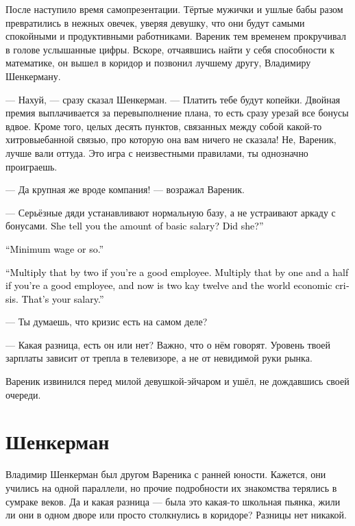 \documentclass[a4paper,10pt,fleqn]{book}\usepackage{polyglossia}\setdefaultlanguage{english}\setotherlanguage{russian}\defaultfontfeatures{Ligatures=TeX,Mapping=tex-text} \usepackage{xcolor}\definecolor{lightgray}{HTML}{bbbbbb}\color{lightgray}\newcommand{\ml}[3]{\textcolor{black}{#3}}
\begin{document}
После наступило время самопрезентации.
Тёртые мужички и ушлые бабы разом превратились в нежных овечек, уверяя девушку, что они будут самыми спокойными и продуктивными работниками.
Вареник тем временем прокручивал в голове услышанные цифры.
Вскоре, отчаявшись найти у себя способности к математике, он вышел в коридор и позвонил лучшему другу, Владимиру Шенкерману.

--- Нахуй, --- сразу сказал Шенкерман.
--- Платить тебе будут копейки.
Двойная премия выплачивается за перевыполнение плана, то есть сразу урезай все бонусы вдвое.
Кроме того, целых десять пунктов, связанных между собой какой-то хитровыебанной связью, про которую она вам ничего не сказала!
Не, Вареник, лучше вали оттуда.
Это игра с неизвестными правилами, ты однозначно проиграешь.

--- Да крупная же вроде компания! --- возражал Вареник.

--- Серьёзные дяди устанавливают нормальную базу, а не устраивают аркаду с бонусами.
\ml{$0$}
{Она сказала тебе размер базового оклада?}
{She tell you the amount of basic salary?}
\ml{$0$}
{Сказала?}
{Did she?''}

\ml{$0$}
{--- МРОТ.}
{``Minimum wage or so.''}

\ml{$0$}
{--- Умножь его на два, если ты хороший работник.}
{``Multiply that by two if you're a good employee.}
\ml{$0$}
{Умножь его на полтора, если ты хороший работник, а на дворе две тысячи двенадцатый год и кризис.}
{Multiply that by one and a half if you're a good employee, and now is two kay twelve and the world economic crisis.}
\ml{$0$}
{Вот твоя зарплата.}
{That's your salary.''}

--- Ты думаешь, что кризис есть на самом деле?

--- Какая разница, есть он или нет?
Важно, что о нём говорят.
Уровень твоей зарплаты зависит от трепла в телевизоре, а не от невидимой руки рынка.

Вареник извинился перед милой девушкой-эйчаром и ушёл, не дождавшись своей очереди.

\section{Шенкерман}

Владимир Шенкерман был другом Вареника с ранней юности.
Кажется, они учились на одной параллели, но прочие подробности их знакомства терялись в сумраке веков.
Да и какая разница --- была это какая-то школьная пьянка, жили ли они в одном дворе или просто столкнулись в коридоре?
Разницы нет никакой.
\end{document}
